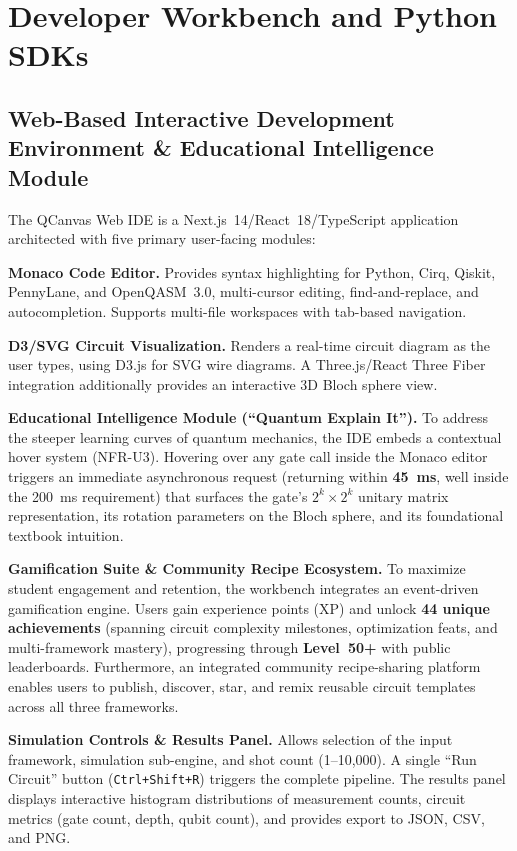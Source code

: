 \documentclass[runningheads]{llncs}
\begin{document}
\section{Developer Workbench and Python SDKs}

\subsection{Web-Based Interactive Development Environment \& Educational Intelligence Module}

The QCanvas Web IDE is a Next.js~14/React~18/TypeScript application architected with five primary user-facing modules:

\textbf{Monaco Code Editor.} Provides syntax highlighting for Python, Cirq, Qiskit, PennyLane, and OpenQASM~3.0, multi-cursor editing, find-and-replace, and autocompletion. Supports multi-file workspaces with tab-based navigation.

\textbf{D3/SVG Circuit Visualization.} Renders a real-time circuit diagram as the user types, using D3.js for SVG wire diagrams. A Three.js/React Three Fiber integration additionally provides an interactive 3D Bloch sphere view.

\textbf{Educational Intelligence Module (``Quantum Explain It'').} To address the steeper learning curves of quantum mechanics, the IDE embeds a contextual hover system (NFR-U3). Hovering over any gate call inside the Monaco editor triggers an immediate asynchronous request (returning within \textbf{45~ms}, well inside the 200~ms requirement) that surfaces the gate's $2^k \times 2^k$ unitary matrix representation, its rotation parameters on the Bloch sphere, and its foundational textbook intuition.

\textbf{Gamification Suite \& Community Recipe Ecosystem.} To maximize student engagement and retention, the workbench integrates an event-driven gamification engine. Users gain experience points (XP) and unlock \textbf{44 unique achievements} (spanning circuit complexity milestones, optimization feats, and multi-framework mastery), progressing through \textbf{Level~50+} with public leaderboards. Furthermore, an integrated community recipe-sharing platform enables users to publish, discover, star, and remix reusable circuit templates across all three frameworks.

\textbf{Simulation Controls \& Results Panel.} Allows selection of the input framework, simulation sub-engine, and shot count (1--10,000). A single ``Run Circuit'' button (\texttt{Ctrl+Shift+R}) triggers the complete pipeline. The results panel displays interactive histogram distributions of measurement counts, circuit metrics (gate count, depth, qubit count), and provides export to JSON, CSV, and PNG.
\end{document}
